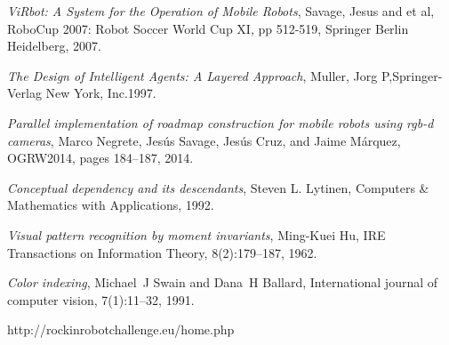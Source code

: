 \documentclass{llncs}
\begin{document}
 


%
%



\begin{thebibliography}{1}


{\em ViRbot: A System for the Operation of Mobile Robots}, Savage, Jesus and et al, RoboCup 2007: Robot Soccer World Cup XI,
pp 512-519, Springer Berlin Heidelberg, 2007.

{\em The Design of Intelligent Agents: A Layered Approach}, Muller, Jorg P,Springer-Verlag New York, Inc.1997.


{\em Parallel implementation of roadmap construction for mobile robots using rgb-d cameras},
Marco Negrete, Jes{\'u}s Savage, Jes{\'u}s Cruz, and Jaime M{\'a}rquez, OGRW2014, pages 184--187, 2014.

{\em Conceptual dependency and its descendants}, Steven L. Lytinen, Computers \& Mathematics with Applications, 1992.

{\em Visual pattern recognition by moment invariants}, Ming-Kuei Hu, IRE Transactions on Information Theory, 8(2):179--187, 1962.

{\em Color indexing},  Michael~J Swain and Dana~H Ballard, International journal of computer vision, 7(1):11--32, 1991.


http://rockinrobotchallenge.eu/home.php


\end{thebibliography}
\end{document}
